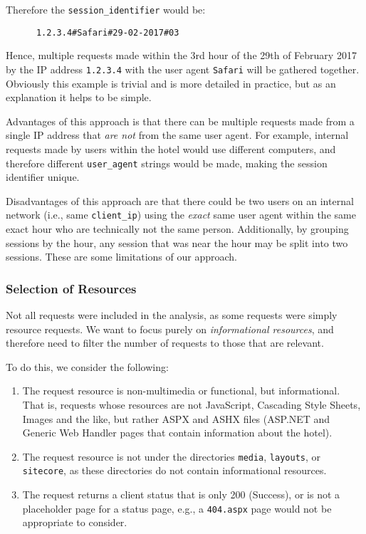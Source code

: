 Therefore the \texttt{session\_identifier} would be:

\begin{lstlisting}
      1.2.3.4#Safari#29-02-2017#03
\end{lstlisting}

Hence, multiple requests made within the 3rd hour of the 29th of February 2017 by the IP address \texttt{1.2.3.4} with the user agent \texttt{Safari} will be gathered together. Obviously this example is trivial and is more detailed in practice, but as an explanation it helps to be simple.

Advantages of this approach is that there can be multiple requests made from a single IP address that \textit{are not} from the same user agent. For example, internal requests made by users within the hotel would use different computers, and therefore different \texttt{user\_agent} strings would be made, making the session identifier unique.

Disadvantages of this approach are that there could be two users on an internal network (i.e., same \texttt{client\_ip}) using the \textit{exact} same user agent within the same exact hour who are technically not the same person. Additionally, by grouping sessions by the hour, any session that was near the hour may be split into two sessions. These are some limitations of our approach.

\subsubsection{Selection of Resources}
\label{sec:method:assumptions:selection_of_resources}

Not all requests were included in the analysis, as some requests were simply resource requests. We want to focus purely on \textit{informational resources}, and therefore need to filter the number of requests to those that are relevant.

To do this, we consider the following:

\begin{enumerate}
  \item The request resource is non-multimedia or functional, but informational. That is, requests whose resources are not JavaScript, Cascading Style Sheets, Images and the like, but rather ASPX and ASHX files (ASP.NET and Generic Web Handler pages that contain information about the hotel).
  \item The request resource is not under the directories \texttt{media}, \texttt{layouts}, or \texttt{sitecore}, as these directories do not contain informational resources.
  \item The request returns a client status that is only 200 (Success), or is not a placeholder page for a status page, e.g., a \texttt{404.aspx} page would not be appropriate to consider.
\end{enumerate}

